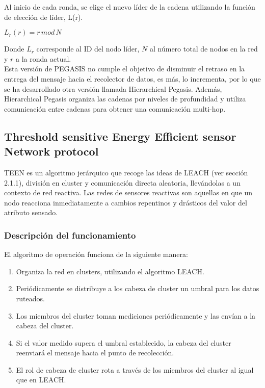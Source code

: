 Al inicio de cada ronda, se elige el nuevo líder de la cadena utilizando la función de elección de líder, L(r).

\begin{center}
 $
   L_{r}(r) = r \, mod\,  N 
 $
\end{center}
Donde $L_{r}$ corresponde al ID del nodo líder, $N$ al número total de nodos en la red y $r$ a la ronda actual.\\

Esta versión de PEGASIS no cumple el objetivo de disminuir el retraso en la entrega del mensaje hacia el recolector de datos, es más, lo incrementa, por lo que se ha desarrollado otra versión llamada Hierarchical Pegasis\cite{hpegasis}. Además, Hierarchical Pegasis organiza las cadenas por niveles de profundidad y utiliza comunicación entre cadenas para obtener una comunicación multi-hop.

\subsection{Threshold sensitive Energy Efficient sensor Network protocol}
TEEN es un algoritmo jerárquico que recoge las ideas de LEACH (ver sección 2.1.1), división en cluster y comunicación directa aleatoria, llevándolas a un contexto de red reactiva. Las redes de sensores reactivas son aquellas en que un nodo reacciona inmediatamente a cambios repentinos y drásticos del valor del atributo sensado. 

\subsubsection{Descripción del funcionamiento}
El algoritmo de operación funciona de la siguiente manera:
\begin{enumerate}
 \item Organiza la red en clusters, utilizando el algoritmo LEACH.
 \item Periódicamente se distribuye a los cabeza de cluster un umbral para los datos ruteados.
 \item Los miembros del cluster toman mediciones periódicamente y las envían a la cabeza del cluster.
 \item Si el valor medido supera el umbral establecido, la cabeza del cluster reenviará el mensaje hacia el punto de recolección.
 \item El rol de cabeza de cluster rota a través de los miembros del cluster al igual que en LEACH. 
\end{enumerate}

